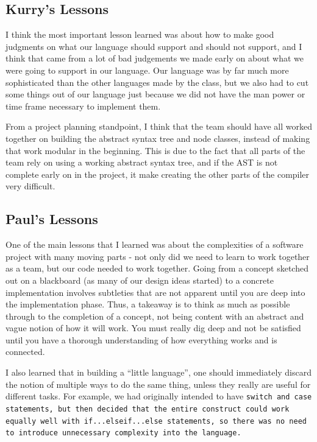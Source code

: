 \documentclass{report}
\begin{document}
\subsection{Kurry's Lessons}
\label{sub:kurrys-lessons}

I think the most important lesson learned was about how to make good judgments
on what our language should support and should not support, and I think that
came from a lot of bad judgements we made early on about what we were going to
support in our language. Our language was by far much more sophisticated than the
other languages made by the class, but we also had to cut some things out of our
language just because we did not have the man power or time frame necessary to
implement them. 

From a project planning standpoint, I think that the team should have all worked 
together on building the abstract syntax tree and node classes, instead of making
that work modular in the beginning. This is due to the fact that all parts of the team
rely on using a working abstract syntax tree, and if the AST is not complete early on
in the project, it make creating the other parts of the compiler very difficult. 

\subsection{Paul's Lessons}
\label{sub:pauls-lessons}

One of the main lessons that I learned was about the complexities of a software project with many moving parts - not only did we need to learn to work together as a team, but our code needed to work together. Going from a concept sketched out on a blackboard (as many of our design ideas started) to a concrete implementation involves subtleties that are not apparent until you are deep into the implementation phase. Thus, a takeaway is to think as much as possible through to the completion of a concept, not being content with an abstract and vague notion of how it will work. You must really dig deep and not be satisfied until you have a thorough understanding of how everything works and is connected.

I also learned that in building a ``little language'', one should immediately discard the notion of multiple ways to do the same thing, unless they really are useful for different tasks. For example, we had originally intended to have \tt switch \rm and \tt case \rm statements, but then decided that the entire construct could work equally well with \tt if...elseif...else \rm statements, so there was no need to introduce unnecessary complexity into the language. 
\end{document}
